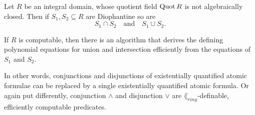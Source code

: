 \begin{lem}\label{lem:intersections and unions}
    Let $R$ be an integral domain, whose quotient field $\operatorname{Quot} R$ is not
    algebraically closed. Then if $S_1, S_2 \subseteq R$ are Diophantine so are
    \[
      S_1 ∩ S_2 \quad \text{and} \quad S_1 ∪ S_2.
    \]

    If $R$ is computable, then there is an algorithm that derives the defining
    polynomial equations for union and intersection efficiently from the
    equations of $S_1$ and $S_2$.
\end{lem}

In other words, conjunctions and disjunctions of existentially quantified atomic
formulae can be replaced by a single existentially quantified atomic formula. Or
again put differently, conjunction $∧$ and disjunction $∨$ are
$\lang_{ring}$-definable, efficiently computable predicates.

